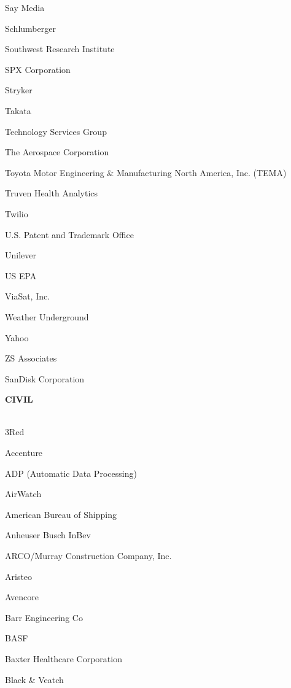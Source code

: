 \documentclass[twoside]{article}
\begin{document}
\begin{center}
\begin{multicols}{5}
\begin{FlushLeft}
\begin{compactitem}
\item Say Media
\item Schlumberger
\item Southwest Research Institute
\item SPX Corporation
\item Stryker
\item Takata
\item Technology Services Group
\item The Aerospace Corporation
\item Toyota Motor Engineering \& Manufacturing North America, Inc. (TEMA)
\item Truven Health Analytics
\item Twilio
\item U.S. Patent and Trademark Office
\item Unilever
\item US EPA
\item ViaSat, Inc.
\item Weather Underground
\item Yahoo
\item ZS Associates
\item SanDisk Corporation
\end{compactitem}
        \end{FlushLeft}
        \vspace{1em}
        {\fontsize{14}{16}\selectfont \bf CIVIL}\\
        \vspace{-1em}
        ~\hrulefill~
        \vspace{-.9em}
        \begin{FlushLeft}
        \begin{compactitem}
        \item 3Red
\item Accenture
\item ADP (Automatic Data Processing)
\item AirWatch
\item American Bureau of Shipping
\item Anheuser Busch InBev
\item ARCO/Murray Construction Company, Inc.
\item Aristeo
\item Avencore
\item Barr Engineering Co
\item BASF
\item Baxter Healthcare Corporation
\item Black \& Veatch

\end{compactitem}
\end{FlushLeft}
\end{multicols}
\end{center}
\end{document}
